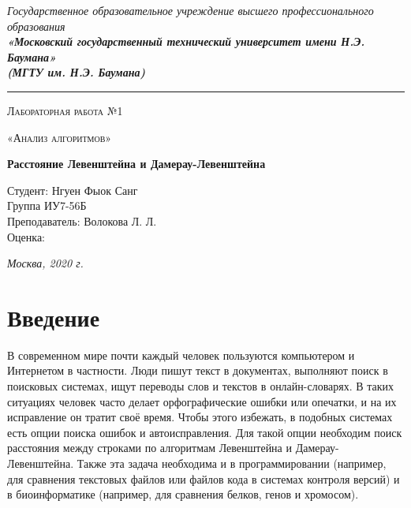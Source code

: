 \documentclass[12pt, a4paper]{report}
\begin{document}
    \begin{titlepage}

        \begin{center}
            \Large
            {\sl Государственное образовательное учреждение высшего профессионального образования\\
            	{\bf«Московский государственный технический университет имени Н.Э. Баумана»\\
            		(МГТУ им. Н.Э. Баумана)}}
            \noindent\rule{\textwidth}{2pt}


            \vspace{3cm}

			{\scshape\LARGE Лабораторная работа №1 \par}
			\vspace{0.3cm}	
			{\scshape\LARGE «Анализ алгоритмов» \par}
			\vspace{1.5cm}
			{\huge\bfseries Расстояние Левенштейна и Дамерау-Левенштейна \par}
			\vspace{2cm}
			\begin{flushleft}
			\Large Студент: Нгуен Фыок Санг\\
			\Large Группа ИУ7-56Б\\
			Преподаватель:  Волокова Л. Л.\\
			Оценка:
			\end{flushleft} 
			
			
		
			\vfill
			\Large \textit {Москва, 2020 г.}
            
        \end{center}

    \end{titlepage}
	
	\tableofcontents
	
	\chapter*{Введение}
	
	В современном мире почти каждый человек пользуются компьютером и Интернетом в частности. Люди пишут текст в документах, выполняют поиск в поисковых системах, ищут переводы слов и текстов в онлайн-словарях. В таких ситуациях человек часто делает орфографические ошибки или опечатки, и на их исправление он тратит своё время. Чтобы этого избежать, в подобных системах есть опции поиска ошибок и автоисправления. Для такой опции необходим поиск расстояния между строками по алгоритмам Левенштейна и Дамерау-Левенштейна. Также эта задача необходима и в программировании (например, для сравнения текстовых файлов или файлов кода в системах контроля версий) и в биоинформатике (например, для сравнения белков, генов и хромосом).
\end{document}
